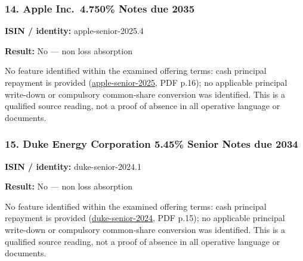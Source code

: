 \documentclass[
  11pt,
]{article}
\begin{document}
\begin{minipage}{\linewidth}

\hypertarget{apple-inc.-4.750-notes-due-2035}{%
\subsubsection{14. Apple Inc.~4.750\% Notes due
2035}\label{apple-inc.-4.750-notes-due-2035}}

\textbf{ISIN / identity:} apple-senior-2025.4

\textbf{Result:} No --- non loss absorption

No feature identified within the examined offering terms: cash principal
repayment is provided
(\href{https://d18rn0p25nwr6d.cloudfront.net/CIK-0000320193/d9065b65-eeb8-439b-97fc-be1d38ce0d2e.pdf}{apple-senior-2025},
PDF p.16); no applicable principal write-down or compulsory common-share
conversion was identified. This is a qualified source reading, not a
proof of absence in all operative language or documents.

\end{minipage}
\par\addvspace{1.1em}

\begin{minipage}{\linewidth}

\hypertarget{duke-energy-corporation-5.45-senior-notes-due-2034}{%
\subsubsection{15. Duke Energy Corporation 5.45\% Senior Notes due
2034}\label{duke-energy-corporation-5.45-senior-notes-due-2034}}

\textbf{ISIN / identity:} duke-senior-2024.1

\textbf{Result:} No --- non loss absorption

No feature identified within the examined offering terms: cash principal
repayment is provided
(\href{https://d18rn0p25nwr6d.cloudfront.net/CIK-0001326160/21faa7ae-4c58-40e0-9928-d7e573d1d2f5.pdf}{duke-senior-2024},
PDF p.15); no applicable principal write-down or compulsory common-share
conversion was identified. This is a qualified source reading, not a
proof of absence in all operative language or documents.

\end{minipage}
\par\addvspace{1.1em}
\end{document}
